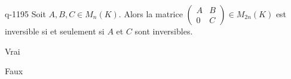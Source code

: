\begin{truefalse}{q-1195}
Soit $A, B, C \in M_n(K)$. Alors la matrice $\begin{pmatrix} A & B \\ 0 & C \end{pmatrix} \in M_{2n}(K)$ est inversible si et seulement si $A$ et $C$ sont inversibles.
\item* Vrai
\item Faux
\end{truefalse}

